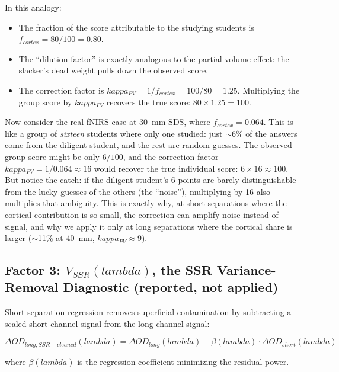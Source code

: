 \documentclass[12pt]{article}
\def\kappa{kappa}%
\def\lambda{lambda}%
\def\text#1{#1}%
\begin{document}
In this analogy:
\begin{itemize}
\item The fraction of the score attributable to the studying students is $f_{\text{cortex}} = 80/100 = 0.80$.
\item The ``dilution factor'' is exactly analogous to the partial volume effect: the slacker's dead weight pulls down the observed score.
\item The correction factor is $\kappa_{\text{PV}} = 1/f_{\text{cortex}} = 100/80 = 1.25$. Multiplying the group score by $\kappa_{\text{PV}}$ recovers the true score: $80 \times 1.25 = 100$.
\end{itemize}

Now consider the real fNIRS case at 30~mm SDS, where $f_{\text{cortex}} = 0.064$. This is like a group of \emph{sixteen} students where only one studied: just $\sim$6\% of the answers come from the diligent student, and the rest are random guesses. The observed group score might be only $6/100$, and the correction factor $\kappa_{\text{PV}} = 1/0.064 \approx 16$ would recover the true individual score: $6 \times 16 \approx 100$. But notice the catch: if the diligent student's $6$ points are barely distinguishable from the lucky guesses of the others (the ``noise''), multiplying by 16 also multiplies that ambiguity. This is exactly why, at short separations where the cortical contribution is so small, the correction can amplify noise instead of signal, and why we apply it only at long separations where the cortical share is larger ($\sim$11\% at 40~mm, $\kappa_{\text{PV}}\approx9$).

\subsection{Factor 3: \texorpdfstring{$V_{\text{SSR}}(\lambda)$}{V\_SSR(lambda)}, the SSR Variance-Removal Diagnostic (reported, not applied)}
\label{sec:vssr}

Short-separation regression removes superficial contamination by subtracting a scaled short-channel signal from the long-channel signal:

\begin{equation}
\Delta\text{OD}_{\text{long, SSR-cleaned}}(\lambda) = \Delta\text{OD}_{\text{long}}(\lambda) - \beta(\lambda) \cdot \Delta\text{OD}_{\text{short}}(\lambda)
\end{equation}

where $\beta(\lambda)$ is the regression coefficient minimizing the residual power.
\end{document}
